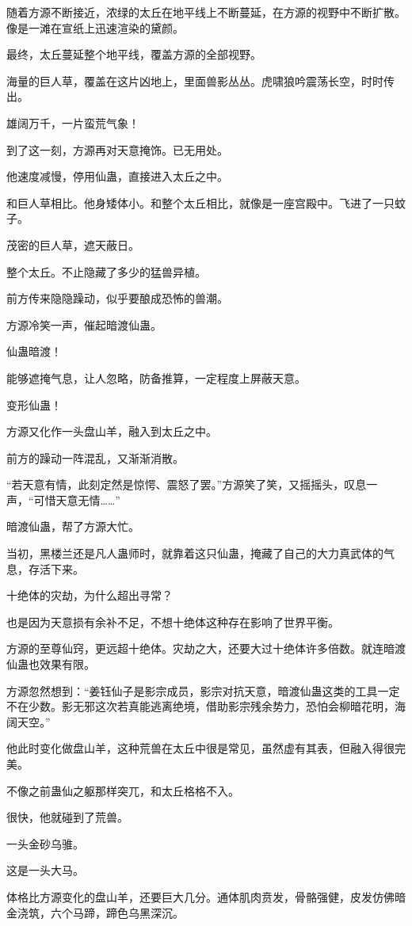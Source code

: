\begin{this_body}
随着方源不断接近，浓绿的太丘在地平线上不断蔓延，在方源的视野中不断扩散。像是一滩在宣纸上迅速渲染的黛颜。

最终，太丘蔓延整个地平线，覆盖方源的全部视野。

海量的巨人草，覆盖在这片凶地上，里面兽影丛丛。虎啸狼吟震荡长空，时时传出。

雄阔万千，一片蛮荒气象！

到了这一刻，方源再对天意掩饰。已无用处。

他速度减慢，停用仙蛊，直接进入太丘之中。

和巨人草相比。他身矮体小。和整个太丘相比，就像是一座宫殿中。飞进了一只蚊子。

茂密的巨人草，遮天蔽日。

整个太丘。不止隐藏了多少的猛兽异植。

前方传来隐隐躁动，似乎要酿成恐怖的兽潮。

方源冷笑一声，催起暗渡仙蛊。

仙蛊暗渡！

能够遮掩气息，让人忽略，防备推算，一定程度上屏蔽天意。

变形仙蛊！

方源又化作一头盘山羊，融入到太丘之中。

前方的躁动一阵混乱，又渐渐消散。

“若天意有情，此刻定然是惊愕、震怒了罢。”方源笑了笑，又摇摇头，叹息一声，“可惜天意无情……”

暗渡仙蛊，帮了方源大忙。

当初，黑楼兰还是凡人蛊师时，就靠着这只仙蛊，掩藏了自己的大力真武体的气息，存活下来。

十绝体的灾劫，为什么超出寻常？

也是因为天意损有余补不足，不想十绝体这种存在影响了世界平衡。

方源的至尊仙窍，更远超十绝体。灾劫之大，还要大过十绝体许多倍数。就连暗渡仙蛊也效果有限。

方源忽然想到：“姜钰仙子是影宗成员，影宗对抗天意，暗渡仙蛊这类的工具一定不在少数。影无邪这次若真能逃离绝境，借助影宗残余势力，恐怕会柳暗花明，海阔天空。”

他此时变化做盘山羊，这种荒兽在太丘中很是常见，虽然虚有其表，但融入得很完美。

不像之前蛊仙之躯那样突兀，和太丘格格不入。

很快，他就碰到了荒兽。

一头金砂乌骓。

这是一头大马。

体格比方源变化的盘山羊，还要巨大几分。通体肌肉贲发，骨骼强健，皮发仿佛暗金浇筑，六个马蹄，蹄色乌黑深沉。


\end{this_body}
